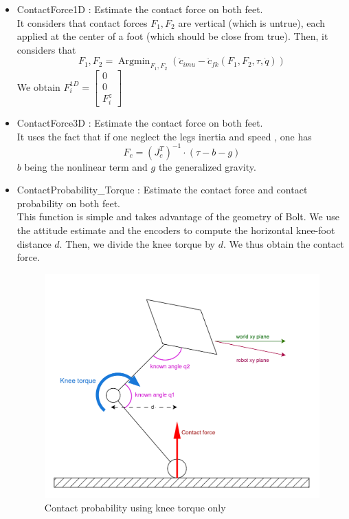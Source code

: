 \documentclass[a4paper,10pt]{article}
\DeclareMathOperator*{\argmin}{Argmin}
\begin{document}
\begin{itemize}
	\item ContactForce1D : Estimate the contact force on both feet.\\
	It considers that contact forces $F_1, F_2$ are vertical (which is untrue), each applied at the center of a foot (which should be close from true). Then, it considers that 
	$$F_1, F_2 = \argmin_{F_1, F_2}(\ddot c_{imu} - \ddot c_{fk}(F_1, F_2, \tau, \dot q))$$
	We obtain $F_i^{1D} = \begin{bmatrix}0\\ 0\\ F_i^z \end{bmatrix}$ 
	\item ContactForce3D : Estimate the contact force on both feet.\\
	It uses the fact that if one neglect the legs inertia and speed \cite{9} \cite{10}, one has 
	$$ F_c = (J_c^T)^{-1} \cdot(\tau - b - g)$$
	$b$ being the nonlinear term and $g$ the generalized gravity.
	\item ContactProbability\_Torque : Estimate the contact force and contact probability on both feet.\\
	This function is simple and takes advantage of the geometry of Bolt. We use the attitude estimate and the encoders to compute the horizontal knee-foot distance $d$. Then, we divide the knee torque by $d$. We thus obtain the contact force.
	\begin{figure}[H]
	\centering
  	\includegraphics[width=\linewidth, angle=0, scale=0.5]{./images/Bolt_KneeTorque.png}
  	\caption{Contact probability using knee torque only}
	\end{figure}
	
\end{itemize}
\end{document}
